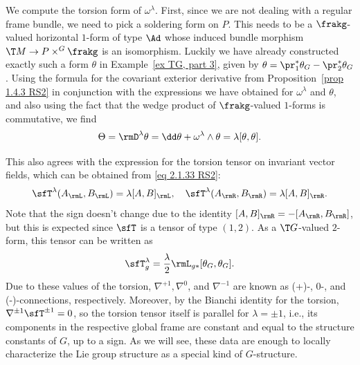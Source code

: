 \begin{example}\label{ex connections on G, part 4}
    We compute the torsion form of $\omega^\lambda$. First, since we are not dealing with a regular frame bundle, we need to pick a soldering form on $P$. This needs to be a $\frakg$-valued horizontal $1$-form of type $\Ad$ whose induced bundle morphism $\T M\to P\times^G \frakg$ is an isomorphism. Luckily we have already constructed exactly such a form $\theta$ in Example~\ref{ex TG, part 3}, given by $\theta=\pr_1^\ast\theta_G-\pr_2^\ast\theta_G$. 
    Using the formula for the covariant exterior derivative from Proposition~\ref{prop 1.4.3 RS2} in conjunction with the expressions we have obtained for $\omega^\lambda$ and $\theta$, and also using the fact that the wedge product of $\frakg$-valued $1$-forms is commutative, we find
    \[\Theta=\rmD^\lambda \theta=\dd \theta+\omega^\lambda\wedge \theta=\lambda[\theta,\theta].\]

    This also agrees with the expression for the torsion tensor on invariant vector fields, which can be obtained from \eqref{eq 2.1.33 RS2}:
    \[\sfT^\lambda(A_\rmL,B_\rmL)=\lambda[A,B]_\rmL,\quad \sfT^\lambda(A_\rmR,B_\rmR)=\lambda [A,B]_\rmR.\]
    Note that the sign doesn't change due to the identity $[A,B]_\rmR=-[A_\rmR,B_\rmR]$, but this is expected since $\sfT$ is a tensor of type $(1,2)$. 
    As a $\T G$-valued $2$-form, this tensor can be written as 
    \[\sfT^\lambda_g=\frac{\lambda}{2} \rmL_{g\ast}[\theta_G,\theta_G].\label{3791731}\]
    Due to these values of the torsion, $\nabla^{+1},\nabla^0$, and $\nabla^{-1}$ are known as (+)-, 0-, and (-)-connections, respectively. 
    Moreover, by the  Bianchi identity for the torsion, $\nabla^{\pm 1}\sfT^{\pm 1}=0$, so the torsion tensor itself is parallel for $\lambda=\pm 1$, i.e., its components in the respective global frame are constant and equal to the structure constants of $G$, up to a sign. As we will see, these data are enough to locally characterize the Lie group structure as a special kind of $G$-structure.


\end{example}
